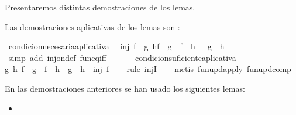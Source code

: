 \begin{isabellebody}
\begin{isamarkuptext}
  Presentaremos distintas demostraciones de los lemas.%
\end{isamarkuptext}\isamarkuptrue%
%
\isadelimdocument
%
\endisadelimdocument
%
\isatagdocument
%
\isamarkuptrue%
%
\endisatagdocument
{\isafolddocument}%
%
\isadelimdocument
%
\endisadelimdocument
%
\begin{isamarkuptext}%
Las demostraciones aplicativas de los lemas son  :%
\end{isamarkuptext}\isamarkuptrue%
\isamarkupfalse%
\ condicion{\isacharunderscore}necesaria{\isacharunderscore}aplicativa{\isacharcolon}\isanewline
\ \ {\isachardoublequoteopen}inj\ f\ {\isasymLongrightarrow}\ {\isacharparenleft}{\isasymforall}g\ h{\isachardot}{\isacharparenleft}f\ {\isasymcirc}\ g\ {\isacharequal}\ f\ {\isasymcirc}\ h{\isacharparenright}\ {\isasymlongrightarrow}\ \ {\isacharparenleft}g\ {\isacharequal}\ h{\isacharparenright}{\isacharparenright}{\isachardoublequoteclose}\isanewline
%
\isadelimproof
\ \ %
\endisadelimproof
%
\isatagproof
{}\isamarkupfalse%
\ {\isacharparenleft}simp\ add{\isacharcolon}\ inj{\isacharunderscore}on{\isacharunderscore}def\ fun{\isacharunderscore}eq{\isacharunderscore}iff{\isacharparenright}\ \isanewline
\ \ \isamarkupfalse%
%
\endisatagproof
{\isafoldproof}%
%
\isadelimproof
\ \isanewline
%
\endisadelimproof
\isanewline
{}\isamarkupfalse%
\ condicion{\isacharunderscore}suficiente{\isacharunderscore}aplicativa{\isacharcolon}\isanewline
{\isachardoublequoteopen}{\isasymforall}g\ h{\isachardot}\ {\isacharparenleft}f\ {\isasymcirc}\ g\ {\isacharequal}\ f\ {\isasymcirc}\ h\ {\isasymlongrightarrow}\ g\ {\isacharequal}\ h{\isacharparenright}\ {\isasymLongrightarrow}\ inj\ f{\isachardoublequoteclose}\isanewline
%
\isadelimproof
\ \ %
\endisadelimproof
%
\isatagproof
{}\isamarkupfalse%
\ {\isacharparenleft}rule\ injI{\isacharparenright}\isanewline
\ \ \isamarkupfalse%
\ {\isacharparenleft}metis\ fun{\isacharunderscore}upd{\isacharunderscore}apply\ fun{\isacharunderscore}upd{\isacharunderscore}comp{\isacharparenright}%
\endisatagproof
{\isafoldproof}%
%
\isadelimproof
%
\endisadelimproof
%
\begin{isamarkuptext}%
En las demostraciones anteriores se han usado los siguientes
 lemas:
  \begin{itemize}
    \item[]  

\end{itemize}
\end{isamarkuptext}
\end{isabellebody}
